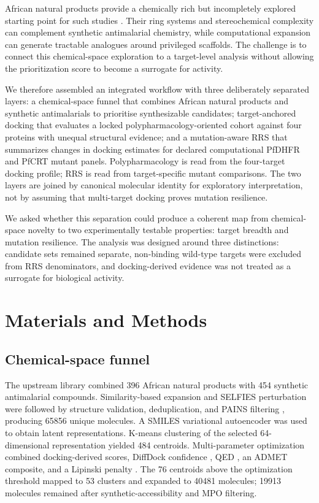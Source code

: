 \documentclass[journal=jcisd8,manuscript=article]{achemso}
\begin{document}
African natural products provide a chemically rich but incompletely explored starting point for such studies \cite{Newman2007,NtieKang2018,Simoben2023,Cheuka2020}. Their ring systems and stereochemical complexity can complement synthetic antimalarial chemistry, while computational expansion can generate tractable analogues around privileged scaffolds. The challenge is to connect this chemical-space exploration to a target-level analysis without allowing the prioritization score to become a surrogate for activity.

We therefore assembled an integrated workflow with three deliberately separated layers: a chemical-space funnel that combines African natural products and synthetic antimalarials to prioritise synthesizable candidates; target-anchored docking that evaluates a locked polypharmacology-oriented cohort against four proteins with unequal structural evidence; and a mutation-aware RRS that summarizes changes in docking estimates for declared computational PfDHFR and PfCRT mutant panels. Polypharmacology is read from the four-target docking profile; RRS is read from target-specific mutant comparisons. The two layers are joined by canonical molecular identity for exploratory interpretation, not by assuming that multi-target docking proves mutation resilience.

We asked whether this separation could produce a coherent map from chemical-space novelty to two experimentally testable properties: target breadth and mutation resilience. The analysis was designed around three distinctions: candidate sets remained separate, non-binding wild-type targets were excluded from RRS denominators, and docking-derived evidence was not treated as a surrogate for biological activity.

\section{Materials and Methods}
\subsection{Chemical-space funnel}
The upstream library combined \num{396} African natural products with \num{454} synthetic antimalarial compounds. Similarity-based expansion and SELFIES perturbation \cite{Nigam2021,Krenn2020} were followed by structure validation, deduplication, and PAINS filtering \cite{Baell2010}, producing \num{65856} unique molecules. A SMILES variational autoencoder \cite{gomez2018automatic} was used to obtain latent representations. K-means clustering of the selected 64-dimensional representation yielded \num{484} centroids. Multi-parameter optimization combined docking-derived scores, DiffDock confidence \cite{Corso2023}, QED \cite{Bickerton2012}, an ADMET composite, and a Lipinski penalty \cite{Lipinski2004}. The \num{76} centroids above the optimization threshold mapped to \num{53} clusters and expanded to \num{40481} molecules; \num{19913} molecules remained after synthetic-accessibility and MPO filtering.
\end{document}
